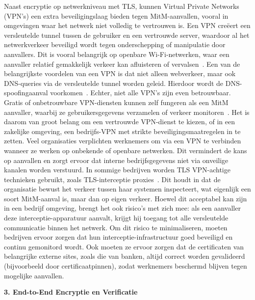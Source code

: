 Naast encryptie op netwerkniveau met TLS, kunnen Virtual Private Networks (VPN’s) een extra beveiligingslaag bieden tegen MitM-aanvallen, vooral in omgevingen waar het netwerk niet volledig te vertrouwen is. Een VPN creëert een versleutelde tunnel tussen de gebruiker en een vertrouwde server, waardoor al het netwerkverkeer beveiligd wordt tegen onderschepping of manipulatie door aanvallers. Dit is vooral belangrijk op openbare Wi-Fi-netwerken, waar een aanvaller relatief gemakkelijk verkeer kan afluisteren of vervalsen~\autocite{ramesh2022}.
Een van de belangrijkste voordelen van een VPN is dat niet alleen webverkeer, maar ook DNS-queries via de versleutelde tunnel worden geleid. Hierdoor wordt de DNS-spoofingaanval voorkomen~\autocite{catchpointdnsattack}. Echter, niet alle VPN’s zijn even betrouwbaar. Gratis of onbetrouwbare VPN-diensten kunnen zelf fungeren als een MitM aanvaller, waarbij ze gebruikersgegevens verzamelen of verkeer monitoren~\autocite{bui2019}. Het is daarom van groot belang om een vertrouwde VPN-dienst te kiezen, of in een zakelijke omgeving, een bedrijfs-VPN met strikte beveiligingsmaatregelen in te zetten.
Veel organisaties verplichten werknemers om via een VPN te verbinden wanneer ze werken op onbekende of openbare netwerken. Dit vermindert de kans op aanvallen en zorgt ervoor dat interne bedrijfsgegevens niet via onveilige kanalen worden verstuurd. In sommige bedrijven worden TLS VPN-achtige technieken gebruikt, zoals TLS-interceptie proxies~\autocite{ncsc2020}. Dit houdt in dat de organisatie bewust het verkeer tussen haar systemen inspecteert, wat eigenlijk een soort MitM-aanval is, maar dan op eigen verkeer. Hoewel dit acceptabel kan zijn in een bedrijf omgeving, brengt het ook risico’s met zich mee: als een aanvaller deze interceptie-apparatuur aanvalt, krijgt hij toegang tot alle versleutelde communicatie binnen het netwerk.
Om dit risico te minimaliseren, moeten bedrijven ervoor zorgen dat hun interceptie-infrastructuur goed beveiligd en continu gemonitord wordt. Ook moeten ze ervoor zorgen dat de certificaten van belangrijke externe sites, zoals die van banken, altijd correct worden gevalideerd (bijvoorbeeld door certificaatpinnen), zodat werknemers beschermd blijven tegen mogelijke aanvallen.

\vspace{0.5cm}
\textbf{3. End-to-End Encryptie en Verificatie}
\vspace{0.5cm}

